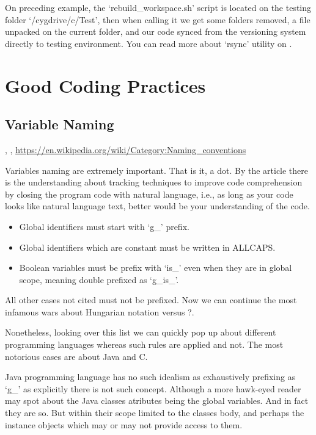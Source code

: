     On preceding example, the `rebuild\_workspace.sh' script is located on the
    testing folder `/cygdrive/c/Test', then when calling it we get some folders
    removed, a file unpacked on the current folder, and our code synced from the
    versioning system directly to testing environment. You can read more about
    `rsync' utility on .



    \section{Good Coding Practices}


    \subsection{Variable Naming}

    \cite{theImpactOfIdentifierStyle},
    \cite{womenAndMen},
    \url{https://en.wikipedia.org/wiki/Category:Naming_conventions}

    Variables naming are extremely important. That is it, a dot. By the article
     there is the understanding about tracking
    techniques to improve code comprehension by closing the program code with
    natural language, i.e., as long as your code looks like natural language
    text, better would be your understanding of the code.

    \begin{itemize}
        \item Global identifiers must start with `g\_' prefix.
        \item Global identifiers which are constant must be written in ALLCAPS.
        \item Boolean variables must be prefix with `is\_' even when they are in
              global scope, meaning double prefixed as `g\_is\_'.
    \end{itemize}

    All other cases not cited must not be prefixed. Now we can continue the most
    infamous wars about Hungarian notation versus ?.

    Nonetheless, looking over this list we can quickly pop up about different
    programming languages whereas such rules are applied and not. The most
    notorious cases are about Java and C.

    Java programming language has no such idealism as exhaustively prefixing as
    `g\_' as explicitly there is not such concept. Although a more hawk-eyed
    reader may spot about the Java classes atributes being the global variables.
    And in fact they are so. But within their scope limited to the classes body,
    and perhaps the instance objects which may or may not provide access to
    them.

